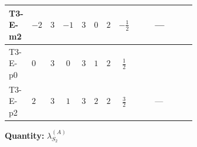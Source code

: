 \documentclass[8pt]{article}
\begin{document}
\begin{landscape}
\begin{longtable}{@{}llcccccc >{\raggedright\arraybackslash}p{0.21\linewidth} >{\raggedright\arraybackslash}p{0.21\linewidth} >{\raggedright\arraybackslash}p{0.21\linewidth}@{}}
\midrule
T3-E-m2 & $-2$ & $3$ & $-1$ & $3$ & $0$ & $2$ & $-\frac{1}{2}$ & \scriptsize\adjustbox{max width=\linewidth}{$\begin{gathered} +\frac{3 {g_2}^4}{4}\end{gathered}$} & --- & \scriptsize\adjustbox{max width=\linewidth}{$\begin{gathered} +{g_2}^2 (-3 {\lambda_{S_2}^{(1)}}-24 {\lambda_{S_2}^{(A)}})\end{gathered}$} \\
\midrule
T3-E-p0 & $0$ & $3$ & $0$ & $3$ & $1$ & $2$ & $\frac{1}{2}$ & \scriptsize\adjustbox{max width=\linewidth}{$\begin{gathered} +\frac{3 {g_2}^4}{4}\end{gathered}$} & \scriptsize\adjustbox{max width=\linewidth}{$\begin{gathered} +{g_1}^2 \left(9 {g_2}^2-\frac{3 {\lambda_{S_2}^{(1)}}}{2}-12 {\lambda_{S_2}^{(A)}}\right)\end{gathered}$} & \scriptsize\adjustbox{max width=\linewidth}{$\begin{gathered} +{g_2}^2 (-3 {\lambda_{S_2}^{(1)}}-24 {\lambda_{S_2}^{(A)}})\end{gathered}$} \\
\midrule
T3-E-p2 & $2$ & $3$ & $1$ & $3$ & $2$ & $2$ & $\frac{3}{2}$ & \scriptsize\adjustbox{max width=\linewidth}{$\begin{gathered} +\frac{3 {g_2}^4}{4}\end{gathered}$} & --- & \scriptsize\adjustbox{max width=\linewidth}{$\begin{gathered} +{g_2}^2 (-3 {\lambda_{S_2}^{(1)}}-24 {\lambda_{S_2}^{(A)}})\end{gathered}$} \\
\midrule
\bottomrule
\end{longtable}
\clearpage
\noindent\textbf{Quantity: }$\lambda_{S_2}^{(A)}$\par\smallskip

\end{landscape}
\end{document}
